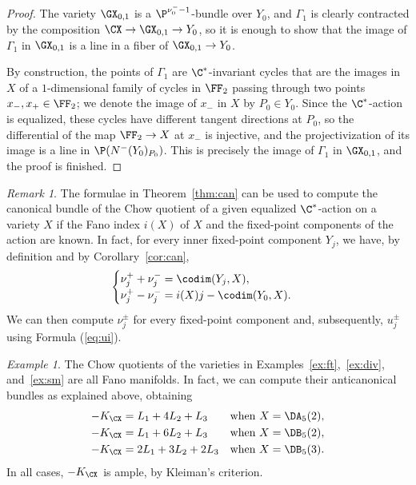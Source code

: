 \documentclass[11pt]{amsart}
\numberwithin{equation}{section}
\theoremstyle{definition}
\theoremstyle{remark}
\newtheorem{remark}[theorem]{Remark}
\newtheorem{example}[theorem]{Example}
\begin{document}
\begin{proof}
The variety $\GX_{0,1}$ is a $\P^{\nu^-_0-1}$-bundle over $Y_0$, and $\Gamma_1$ is clearly contracted by the composition $\CX\to \GX_{0,1}\to Y_0$, so it is enough to show that the image of $\Gamma_1$ in  $\GX_{0,1}$ is a line in a fiber of $\GX_{0,1}\to Y_0$. 

By construction, the points of $\Gamma_1$  are $\C^*$-invariant cycles that are the images in $X$ of a $1$-dimensional family of cycles in $\FF_2$ passing through two points $x_-,x_+\in\FF_2$; we denote the image of $x_-$ in $X$ by $P_0\in Y_0$. Since the $\C^*$-action is equalized, these cycles have different tangent directions at $P_0$, so the differential of the map $\FF_2\to X$ at $x_-$ is injective, and the projectivization of its image is a line in $\P(N^-(Y_0)_{P_0})$. This is precisely the image of $\Gamma_1$ in $\GX_{0,1}$, and the proof is finished.
\end{proof}

\begin{remark}\label{rem:howtouse}The formulae in Theorem~\ref{thm:can} can be used to compute the canonical bundle of the Chow quotient of a given equalized $\C^*$-action on a variety $X$ if the Fano index $i(X)$ of $X$ and the fixed-point components of the action are known. In fact, for every inner fixed-point component $Y_j$, we have, by definition and   by Corollary~\ref{cor:can},  
\[
\begin{cases}
\nu_j^+ + \nu_j^- = \codim (Y_j,X),\\
\nu_j^+ - \nu_j^- = i(X)j - \codim(Y_0,X).
\end{cases}
\]
We can then compute $\nu_j^\pm$ for every fixed-point component and, subsequently, $u_j^\pm$ using Formula (\ref{eq:ui}).
\end{remark}

\begin{example} The Chow quotients of the varieties in Examples~\ref{ex:ft},~\ref{ex:div}, and~\ref{ex:sm} are all Fano manifolds. In fact, we can compute their anticanonical bundles as explained above, obtaining
\[\begin{aligned}
 -K_{\CX}&= L_1 + 4L_2+L_3  &\mbox{when } X &=\DA_5(2), \nonumber \\
 -K_{\CX}&= L_1 + 6L_2+L_3  & \mbox{when } X &=\DB_5(2), \nonumber \\
 -K_{\CX}&= 2L_1 + 3L_2+2L_3 &\mbox{when } X &=\DB_5(3). \nonumber 
\end{aligned}
\]
In all cases, $-K_{\CX}$ is ample, by Kleiman's criterion.
\end{example}
\end{document}
